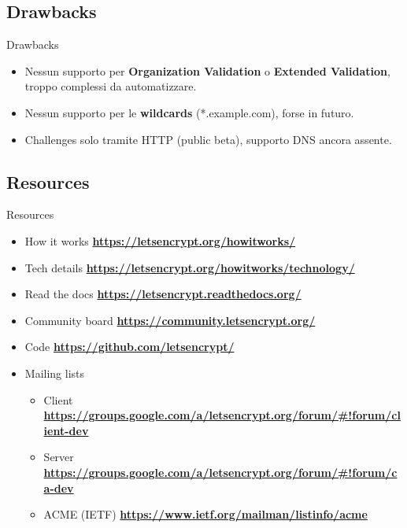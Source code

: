 \documentclass[xcolor=svgnames,11pt]{beamer}
\begin{document}
\subsection{Drawbacks}
\begin{frame}{Drawbacks}
\begin{itemize}
  \item Nessun supporto per \textbf{Organization Validation} o \textbf{Extended
  Validation}, troppo complessi da automatizzare.
  \medskip\pause
  \item Nessun supporto per le \textbf{wildcards} (*.example.com), forse in futuro.
  \medskip\pause
  \item Challenges solo tramite HTTP (public beta), supporto DNS ancora assente.
\end{itemize}
\end{frame}

\subsection{Resources}
\begin{frame}{Resources}
\begin{small}
\begin{itemize}
  \item How it works \textbf{\url{https://letsencrypt.org/howitworks/}}
  \medskip
  \item Tech details \textbf{\url{https://letsencrypt.org/howitworks/technology/}}
  \medskip
  \item Read the docs \textbf{\url{https://letsencrypt.readthedocs.org/}}
  \medskip
  \item Community board \textbf{\url{https://community.letsencrypt.org/}}
  \medskip
  \item Code \textbf{\url{https://github.com/letsencrypt/}}
  \medskip
  \item Mailing lists
  \begin{itemize}
    \item Client \textbf{\url{https://groups.google.com/a/letsencrypt.org/forum/\#!forum/client-dev}}
    \item Server \textbf{\url{https://groups.google.com/a/letsencrypt.org/forum/\#!forum/ca-dev}}
    \item ACME (IETF) \textbf{\url{https://www.ietf.org/mailman/listinfo/acme}}
  \end{itemize}
\end{itemize}
\end{small}
\end{frame}
\end{document}
